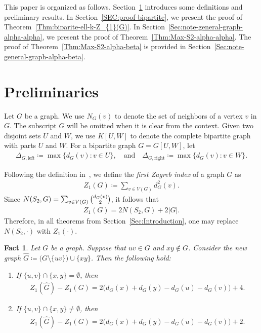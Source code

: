 \documentclass[11pt,a4paper]{article}
\newtheorem{fact}[definition]{Fact}
\begin{document}
This paper is organized as follows. 
Section~\ref{SEC:Prelim} introduces some definitions and preliminary results. 
In Section~\ref{SEC:proof-bipartite}, we present the proof of Theorem~\ref{Thm:biparite-ell-k-Z_{1}(G)}. 
In Section~\ref{Sec:note-general-graph-alpha-alpha}, we present the proof of Theorem~\ref{Thm:Max-S2-alpha-alpha}. 
The proof of Theorem~\ref{Thm:Max-S2-alpha-beta} is provided in Section~\ref{Sec:note-general-graph-alpha-beta}. 

\section{Preliminaries}\label{SEC:Prelim}
Let $G$ be a graph. 
We use $N_{G}(v)$ to denote the set of neighbors of a vertex $v$ in $G$. 
The subscript $G$ will be omitted when it is clear from the context. 
Given two disjoint sets $U$ and $W$, we use $K[U,W]$ to denote the complete bipartite graph with parts $U$ and $W$. 
For a bipartite graph $G = G[U,W]$, let 
\begin{align*}
\Delta_{G, \mathrm{left}} 
\coloneqq \max\{d_{G}(v) \colon v \in U\}, 
\quad \text{and} \quad 
\Delta_{G, \mathrm{right}} 
\coloneqq \max\{d_{G}(v) \colon v \in W\}.
\end{align*}

Following the definition in~\cite{GT72}, we define the \emph{first Zagreb index} of a graph $G$ as  
\begin{align*}
    Z_{1}(G)
    \coloneqq \sum_{v \in V(G)} d_{G}^{2}(v). 
\end{align*}
%
Since $N(S_2, G) = \sum_{v \in V(G)} \tbinom{d_{G}(v)}{2}$, it follows that 
\begin{align}\label{equ:Zagreb-index-S2}
    Z_{1}(G) = 2 N(S_2, G) + 2|G|. 
\end{align}
%
Therefore, in all theorems from Section~\ref{Sec:Introduction}, one may replace $N(S_{2}, \cdot)$ with $Z_{1}(\cdot)$. 

\begin{fact}\label{FACT:Z_{1}(G)-del-uv-add-xy}
    Let $G$ be a graph. 
    Suppose that $u v \in G$ and $xy \not\in G$. 
    Consider the new graph $\hat{G} \coloneqq \big( G \setminus \{uv\} \big) \cup \{xy\}$. 
    Then the following hold: 
    \begin{enumerate}[label=(\roman*)]
        \item\label{FACT:Z_{1}(G)-del-uv-add-xy-a} If $\{u,v\} \cap \{x, y\} = \emptyset$, then 
        \begin{align*}
            Z_{1}(\hat{G}) - Z_{1}(G)
            = 2 \big( d_{G}(x) + d_{G}(y) - d_{G}(u) - d_{G}(v) \big) + 4. 
        \end{align*}
        \item\label{FACT:Z_{1}(G)-del-uv-add-xy-b} If $\{u,v\} \cap \{x, y\} \neq \emptyset$, then  
        \begin{align*}
            Z_{1}(\hat{G}) - Z_{1}(G)
            = 2 \big( d_{G}(x) + d_{G}(y) - d_{G}(u) - d_{G}(v) \big) + 2. 
        \end{align*}
    \end{enumerate}
\end{fact}
\end{document}

